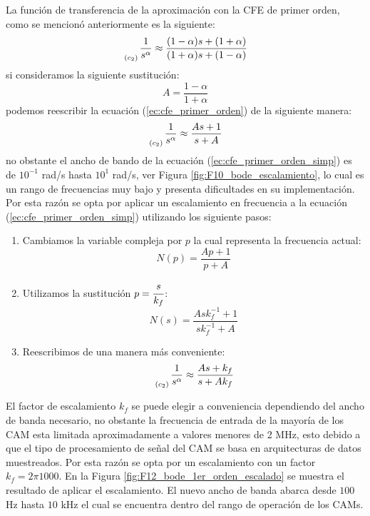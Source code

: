 	La función de transferencia de la aproximación con la CFE de primer orden, como se mencionó anteriormente es la siguiente:
	\begin{equation}
		\genfrac{}{}{0pt}{0}{}{_{(c_{2})}} \frac{1}{s^{\alpha}} \approx \frac{(1 - \alpha)s + (1 + \alpha) }{(1 + \alpha)s + (1 - \alpha)} 
		\label{ec:cfe_primer_orden}
	\end{equation}
	si consideramos la siguiente sustitución:
	\begin{equation}
		A = \frac{1 - \alpha}{1 + \alpha}
	\end{equation}
	podemos reescribir la ecuación (\ref{ec:cfe_primer_orden}) de la siguiente manera:
	\begin{equation}
		\genfrac{}{}{0pt}{0}{}{_{(c_{2})}} \frac{1}{s^{\alpha}} \approx \frac{A s + 1}{s + A}
		\label{ec:cfe_primer_orden_simp}
	\end{equation}
	no obstante el ancho de bando de la ecuación (\ref{ec:cfe_primer_orden_simp}) es de $10^{-1}$ rad/s hasta $10^{1}$ rad/s, ver Figura \ref{fig:F10_bode_escalamiento}, lo cual es un rango de frecuencias muy bajo y presenta dificultades en su implementación. Por  esta razón se opta por aplicar un escalamiento en frecuencia a la ecuación (\ref{ec:cfe_primer_orden_simp}) utilizando los siguiente pasos: 
	
	\begin{enumerate}
		\item Cambiamos la variable compleja por $p$ la cual representa la frecuencia actual:
			\begin{equation}
				N(p) =  \frac{A p + 1}{p + A}
			\end{equation}
		\item Utilizamos la sustitución $p = \cfrac{s}{k_{f}}$:
			\begin{equation}
				N(s) =  \frac{A s k_{f}^{-1} + 1}{s k_{f}^{-1} + A}
			\end{equation}
		\item Reescribimos de una manera más conveniente:
			\begin{equation}
				\genfrac{}{}{0pt}{0}{}{_{(c_{2})}} \frac{1}{s^{\alpha}} \approx \frac{A s + k_{f}}{s + A k_{f}}
				\label{ec:cfe_primer_orden_simp_esc}
			\end{equation}
	\end{enumerate}	
		
	El factor de escalamiento $k_{f}$ se puede elegir a conveniencia dependiendo del ancho de banda necesario, no obstante la frecuencia de entrada de la mayoría de los CAM esta limitada aproximadamente a valores menores de 2 MHz, esto debido a que el tipo de procesamiento de señal del CAM se basa en arquitecturas de datos muestreados. Por esta razón se opta por un escalamiento con un factor $k_{f} = 2\pi 1000$. En la Figura \ref{fig:F12_bode_1er_orden_escalado} se muestra el resultado de aplicar el escalamiento. El nuevo ancho de banda abarca desde $100$ Hz hasta $10$ kHz el cual se encuentra dentro del rango de operación de los CAMs.
	
